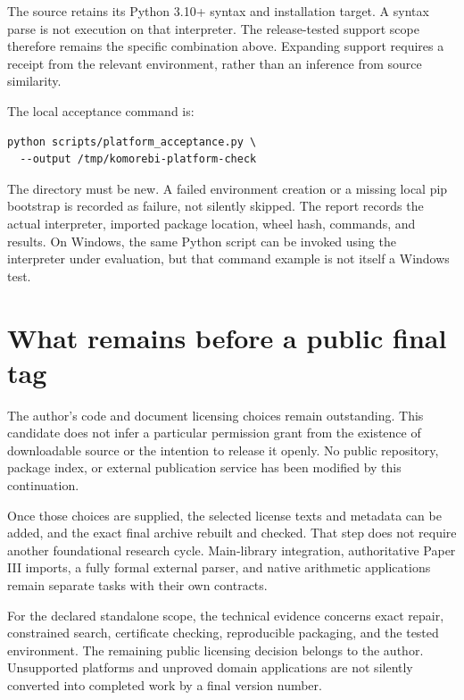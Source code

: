 The source retains its Python 3.10+ syntax and installation target. A syntax parse is not execution on that interpreter. The release-tested support scope therefore remains the specific combination above. Expanding support requires a receipt from the relevant environment, rather than an inference from source similarity.

The local acceptance command is:

\begin{Verbatim}[fontsize=\small,breaklines=true]
python scripts/platform_acceptance.py \
  --output /tmp/komorebi-platform-check
\end{Verbatim}

The directory must be new. A failed environment creation or a missing local pip bootstrap is recorded as failure, not silently skipped. The report records the actual interpreter, imported package location, wheel hash, commands, and results. On Windows, the same Python script can be invoked using the interpreter under evaluation, but that command example is not itself a Windows test.

\section{What remains before a public final tag}

The author's code and document licensing choices remain outstanding. This candidate does not infer a particular permission grant from the existence of downloadable source or the intention to release it openly. No public repository, package index, or external publication service has been modified by this continuation.

Once those choices are supplied, the selected license texts and metadata can be added, and the exact final archive rebuilt and checked. That step does not require another foundational research cycle. Main-library integration, authoritative Paper III imports, a fully formal external parser, and native arithmetic applications remain separate tasks with their own contracts.

\begin{scopebox}[title=The final gate is not a new mathematical conjecture]
For the declared standalone scope, the technical evidence concerns exact repair, constrained search, certificate checking, reproducible packaging, and the tested environment. The remaining public licensing decision belongs to the author. Unsupported platforms and unproved domain applications are not silently converted into completed work by a final version number.
\end{scopebox}
